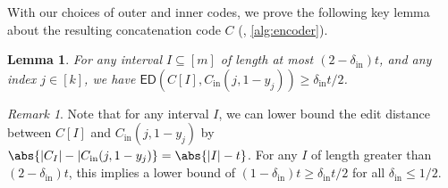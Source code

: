 \documentclass[10pt,a4paper]{article}
\newtheorem{lemma}{Lemma}
\theoremstyle{remark}
\newtheorem{remark}{Remark}
\newcommand{\ie}{\text{i.e.}\xspace}
\newcommand{\tuple}[1]{\ensuremath{\left(#1\right)}}
\newcommand{\tp}{\tuple}
\newcommand{\ED}{\ensuremath{\mathsf{ED}}\xspace}%
\newcommand{\authnote}[3]{\textcolor{#2}{{\sf (#1's Note: {\sl{#3}})}}}
\newcommand{\alex}[1]{\authnote{Alex}{orange}{#1}}
\newcommand{\authnote}{}
\newcommand{\alex}[1]{}
\newcommand{\Cin}{C_{\text{in}}}
\newcommand{\din}{\delta_{\text{in}}}
\begin{document}
With our choices of outer and inner codes, we prove the following key lemma about the resulting concatenation code $C$ (\ie, \cref{alg:encoder}).
\begin{lemma}\label{lem:self-nonsimilarity}
	For any interval $I \subseteq [m]$ of length at most $(2-\din)t$, and any index $j \in [k]$, we have $\ED\tp{C[I], \Cin(j, 1-y_j)} \ge \din t/2$.
\end{lemma}
\begin{remark}
	Note that for any interval $I$, we can lower bound the edit distance between $C[I]$ and $\Cin(j, 1-y_j)$ by $\abs{|C_I| - |\Cin(j,1-y_j)} = \abs{|I| - t}$. 
	For any $I$ of length greater than $(2-\din) t$, this implies a lower bound of $(1-\din) t \geq \din t / 2$ for all $\din \leq 1/2$.
\end{remark}
\end{document}
